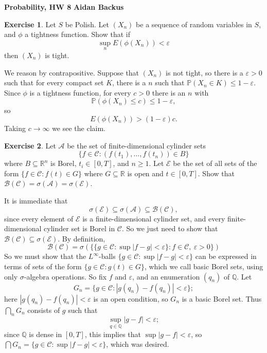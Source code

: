 \documentclass[10pt]{article}
\newcommand{\QQ}{\mathbb{Q}}
\newcommand{\RR}{\mathbb{R}}
\newcommand{\PP}{\mathbb P}
\theoremstyle{definition}
\newtheorem{exer}{Exercise}
\begin{document}
\noindent
\large\textbf{Probability, HW 8} \hfill \textbf{Aidan Backus} \\



\begin{exer}
Let $S$ be Polish. Let $(X_n)$ be a sequence of random variables in $S$, and $\phi$ a tightness function.
Show that if
$$\sup_n E(\phi(X_n)) < \varepsilon$$
then $(X_n)$ is tight.
\end{exer}

We reason by contrapositive. Suppose that $(X_n)$ is not tight, so there is a $\varepsilon > 0$ such that for every compact set $K$, there is a $n$ such that $\PP(X_n \in K) \leq 1 - \varepsilon$.
Since $\phi$ is a tightness function, for every $c > 0$ there is an $n$ with
$$\PP(\phi(X_n) \leq c) \leq 1 - \varepsilon,$$
so
$$E(\phi(X_n)) > (1 - \varepsilon)c.$$
Taking $c \to \infty$ we see the claim.

\begin{exer}
Let $\mathcal A$ be the set of finite-dimensional cylinder sets
$$\{f \in \mathcal C: (f(t_1), \dots, f(t_n)) \in B\}$$
where $B \subseteq \RR^n$ is Borel, $t_i \in [0, T]$, and $n \geq 1$. Let $\mathcal E$ be the set of all sets of the form $\{f \in \mathcal C: f(t) \in G\}$ where $G \subseteq \RR$ is open and $t \in [0, T]$.
Show that $\mathcal B(\mathcal C) = \sigma(\mathcal A) = \sigma(\mathcal E)$.
\end{exer}

It is immediate that
$$\sigma(\mathcal E) \subseteq \sigma(\mathcal A) \subseteq \mathcal B(\mathcal C),$$
since every element of $\mathcal E$ is a finite-dimensional cylinder set, and every finite-dimensional cylinder set is Borel in $\mathcal C$.
So we just need to show that $\mathcal B(\mathcal C) \subseteq \sigma(\mathcal E)$.
By definition,
$$\mathcal B(\mathcal C) = \sigma(\{\{g \in \mathcal C: \sup |f - g| < \varepsilon\}: f \in \mathcal C,~\varepsilon > 0\})$$
So we must show that the $L^\infty$-balls $\{g \in \mathcal C: \sup |f - g| < \varepsilon\}$ can be expressed in terms of sets of the form $\{g \in \mathcal C: g(t) \in G\}$, which we call basic Borel sets, using only $\sigma$-algebra operations.
So fix $f$ and $\varepsilon$, and an enumeration $(q_n)$ of $\QQ$. Let
$$G_n = \{g \in \mathcal C: |g(q_n) - f(q_n)| < \varepsilon\};$$
here $|g(q_n) - f(q_n)| < \varepsilon$ is an open condition, so $G_n$ is a basic Borel set. Thus $\bigcap_n G_n$ consists of $g$ such that
$$\sup_{q \in \QQ} |g - f| < \varepsilon;$$
since $\QQ$ is dense in $[0, T]$, this implies that $\sup |g - f| < \varepsilon$, so $\bigcap G_n = \{g \in \mathcal C: \sup |f - g| < \varepsilon\}$, which was desired.
\end{document}
